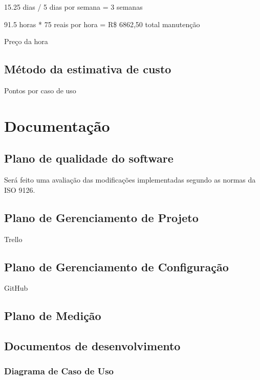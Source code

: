 15.25 dias / 5 dias por semana =  3 semanas

91.5 horas *  75 reais por hora = R\$ 6862,50 total manutenção

Preço da hora
\subsection{Método da estimativa de custo}

Pontos por caso de uso

\section{Documentação}

\subsection{Plano de qualidade do software}
	Será feito uma avaliação das modificações implementadas segundo as normas da ISO 9126.
\subsection{Plano de Gerenciamento de Projeto}

Trello

\subsection{Plano de Gerenciamento de Configuração}

GitHub

\subsection{Plano de Medição}

\subsection{Documentos de desenvolvimento}

\subsubsection{Diagrama de Caso de Uso}

